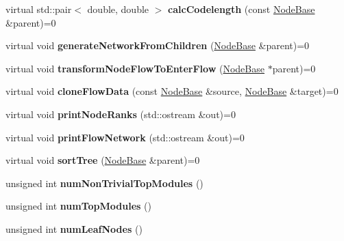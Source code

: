 \begin{DoxyCompactItemize}
virtual std\+::pair$<$ double, double $>$ {\bfseries calc\+Codelength} (const \mbox{\hyperlink{classNodeBase}{Node\+Base}} \&parent)=0
\item 
\mbox{\label{classInfomapBase_ada59370de9cad46ea24d1d3cdc85121f}} 
virtual void {\bfseries generate\+Network\+From\+Children} (\mbox{\hyperlink{classNodeBase}{Node\+Base}} \&parent)=0
\item 
\mbox{\label{classInfomapBase_ac14aed38b85ffe52f3a567c1774a5f42}} 
virtual void {\bfseries transform\+Node\+Flow\+To\+Enter\+Flow} (\mbox{\hyperlink{classNodeBase}{Node\+Base}} $\ast$parent)=0
\item 
\mbox{\label{classInfomapBase_afd72c0011eea101e8ec594b97afc16fa}} 
virtual void {\bfseries clone\+Flow\+Data} (const \mbox{\hyperlink{classNodeBase}{Node\+Base}} \&source, \mbox{\hyperlink{classNodeBase}{Node\+Base}} \&target)=0
\item 
\mbox{\label{classInfomapBase_af0c1c0631a612c78f4d05bfce17c573b}} 
virtual void {\bfseries print\+Node\+Ranks} (std\+::ostream \&out)=0
\item 
\mbox{\label{classInfomapBase_a8b533aff01353379455bfd178997b374}} 
virtual void {\bfseries print\+Flow\+Network} (std\+::ostream \&out)=0
\item 
\mbox{\label{classInfomapBase_a452bbdb5f952c4d497c49908aaa20ab1}} 
virtual void {\bfseries sort\+Tree} (\mbox{\hyperlink{classNodeBase}{Node\+Base}} \&parent)=0
\item 
\mbox{\label{classInfomapBase_a53664f99d89e22c5175e00c9ed934b64}} 
unsigned int {\bfseries num\+Non\+Trivial\+Top\+Modules} ()
\item 
\mbox{\label{classInfomapBase_afbd9e063924f287b9b0e57bb9e814ed9}} 
unsigned int {\bfseries num\+Top\+Modules} ()
\item 
\mbox{\label{classInfomapBase_aa3e574923c01fd92b79dfd1b40243846}} 
unsigned int {\bfseries num\+Leaf\+Nodes} ()
\item 
\mbox{\label{classInfomapBase_aadd0567d1b173d19e421291f606c04a3}} 

\end{DoxyCompactItemize}
